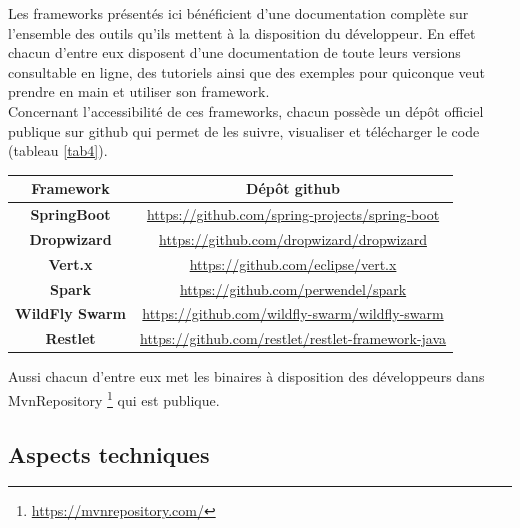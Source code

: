 \documentclass[12pt, a4paper, openany]{report}
\begin{document}
   Les frameworks présentés ici bénéficient d’une documentation complète sur l’ensemble des outils qu’ils mettent à la disposition du développeur. En effet chacun d’entre eux disposent d’une documentation de toute leurs versions consultable en ligne, des tutoriels ainsi que des exemples pour quiconque veut prendre en main et utiliser son framework.\\
   
   Concernant l’accessibilité de ces frameworks, chacun possède un dépôt officiel publique sur github qui permet de les suivre, visualiser et télécharger le code (tableau \ref{tab4}).
   
   \begin{center}
   \begin{tabular}{|c|c|}
    \hline
    
    \rowcolor[rgb]{0.5,0.5,0}\textbf{Framework}&\textbf{Dépôt github} \\ \hline
    
    \textbf{SpringBoot} & \url{https://github.com/spring-projects/spring-boot} \\ \hline
     
    \textbf{Dropwizard} & \url{https://github.com/dropwizard/dropwizard} \\ \hline
     
     \textbf{Vert.x} & \url{https://github.com/eclipse/vert.x} \\ \hline
     
     \textbf{Spark} & \url{https://github.com/perwendel/spark}  \\ \hline
     
     \textbf{WildFly Swarm} & \url{https://github.com/wildfly-swarm/wildfly-swarm}  \\ \hline
     
     \textbf{Restlet} & \url{https://github.com/restlet/restlet-framework-java}  \\ \hline
     
   \end{tabular}
   \label{tab4}
   \end{center}
   
   
    Aussi chacun d’entre eux met les binaires à disposition des développeurs dans MvnRepository \footnote{\url{https://mvnrepository.com/}} qui est publique.
   


  \subsection{Aspects techniques}
  
\end{document}
